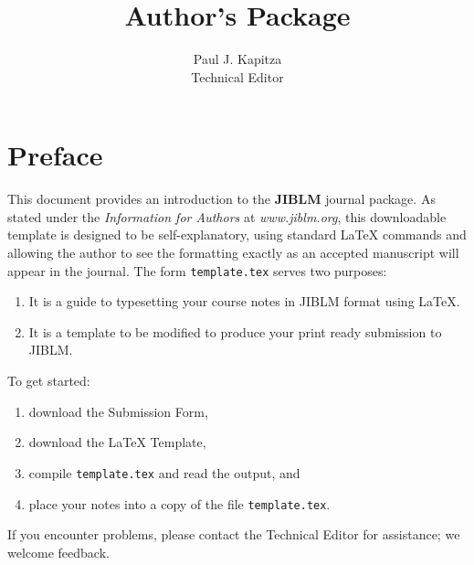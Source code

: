 


%
\InstructorVersion
%



\large
\frontmatter
\title{Author's Package }
\author{Paul J. Kapitza \\ Technical Editor}
\maketitle
\tableofcontents

\chapter{Preface}

This document provides an introduction to the \textbf{JIBLM} journal package.
As stated under the \emph{Information for Authors} at \emph{www.jiblm.org},
this downloadable template is designed to be self-explanatory,
using standard LaTeX commands and allowing the author to see the formatting exactly as
an accepted manuscript will appear in the journal.  The form \texttt{template.tex} serves two purposes:
\begin{enumerate}
\item It is a guide to typesetting your course notes in JIBLM format using \LaTeX.
\item It is a template to be modified to produce your print ready submission to JIBLM.
\end{enumerate}

\noindent
To get started:
\begin{enumerate}
\item download the Submission Form,
\item download the LaTeX Template,
\item compile \texttt{template.tex} and read the output, and
\item place your notes into a copy of the file \texttt{template.tex}.
\end{enumerate}

\noindent
If you encounter problems, please contact the Technical Editor for assistance;
we welcome feedback.




